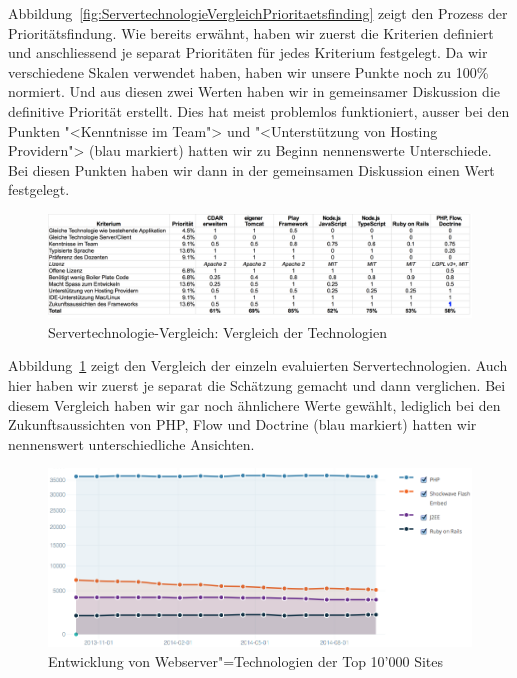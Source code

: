 			Abbildung~\ref{fig:ServertechnologieVergleichPrioritaetsfinding} zeigt den Prozess der Prioritätsfindung.
			Wie bereits erwähnt, haben wir zuerst die Kriterien definiert und 
			anschliessend je separat Prioritäten für jedes Kriterium festgelegt.
			Da wir verschiedene Skalen verwendet haben, haben wir unsere Punkte noch zu 100\% normiert.
			Und aus diesen zwei Werten haben wir in gemeinsamer Diskussion die definitive Priorität erstellt.
			Dies hat meist problemlos funktioniert, ausser bei den Punkten "<Kenntnisse im Team"> und "<Unterstützung von Hosting Providern"> (blau markiert) hatten wir zu Beginn nennenswerte Unterschiede.
			Bei diesen Punkten haben wir dann in der gemeinsamen Diskussion einen Wert festgelegt.
		
			\begin{figure}[H]
				\begin{minipage}[b]{\linewidth}
					\includegraphics[width=\textwidth]{media/spreadsheets/ServertechnologieVergleichVergleichDerTechnologien.pdf}
					\centering
					\caption{Servertechnologie-Vergleich: Vergleich der Technologien}
					\label{fig:ServertechnologieVergleichVergleichDerTechnologien.pdf}
				\end{minipage}
			\end{figure}
			
			Abbildung~\ref{fig:ServertechnologieVergleichVergleichDerTechnologien.pdf} zeigt den Vergleich der einzeln evaluierten Servertechnologien.
			Auch hier haben wir zuerst je separat die Schätzung gemacht und dann verglichen.
			Bei diesem Vergleich haben wir gar noch ähnlichere Werte gewählt, lediglich bei den Zukunftsaussichten von PHP, Flow und Doctrine (blau markiert) hatten wir nennenswert unterschiedliche Ansichten.
			
			\begin{figure}
					\includegraphics[width=\textwidth]{media/img/EntwicklungVonWebserverTechnologien.png}
					\centering
					\caption{Entwicklung von Webserver"=Technologien der Top 10'000 Sites \cite{builtwith_pty_ltd_framework_2014}}
					\label{fig:EntwicklungVonWebserverTechnologien}
			\end{figure}
			
